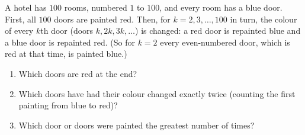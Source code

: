 A hotel has $100$ rooms, numbered $1$ to $100$, and every room has a blue door. First, all $100$ doors are painted red. Then, for $k=2,3,\dots,100$ in turn, the colour of every $k$th door (doors $k,2k,3k,\dots$) is changed: a red door is repainted blue and a blue door is repainted red. (So for $k=2$ every even-numbered door, which is red at that time, is painted blue.)
\begin{enumerate}
\item[(a)] Which doors are red at the end?
\item[(b)] Which doors have had their colour changed exactly twice (counting the first painting from blue to red)?
\item[(c)] Which door or doors were painted the greatest number of times?
\end{enumerate}
